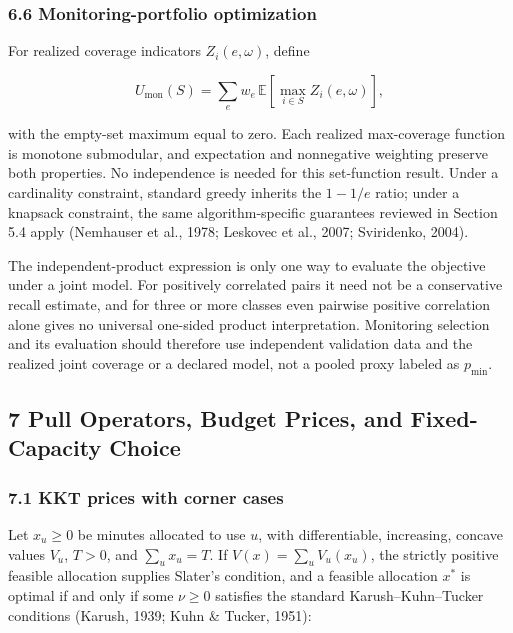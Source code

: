 \documentclass[
  11pt]{article}
\begin{document}
\subsubsection{6.6 Monitoring-portfolio
optimization}\label{monitoring-portfolio-optimization}

For realized coverage indicators \(Z_i(e,\omega)\), define

\[U_{\mathrm{mon}}(S)=\sum_e w_e\,\mathbb E\!\left[\max_{i\in S}Z_i(e,\omega)\right],\]

with the empty-set maximum equal to zero. Each realized max-coverage
function is monotone submodular, and expectation and nonnegative
weighting preserve both properties. No independence is needed for this
set-function result. Under a cardinality constraint, standard greedy
inherits the \(1-1/e\) ratio; under a knapsack constraint, the same
algorithm-specific guarantees reviewed in Section 5.4 apply (Nemhauser
et al., 1978; Leskovec et al., 2007; Sviridenko, 2004).

The independent-product expression is only one way to evaluate the
objective under a joint model. For positively correlated pairs it need
not be a conservative recall estimate, and for three or more classes
even pairwise positive correlation alone gives no universal one-sided
product interpretation. Monitoring selection and its evaluation should
therefore use independent validation data and the realized joint
coverage or a declared model, not a pooled proxy labeled as
\(p_{\min}\).

\subsection{7 Pull Operators, Budget Prices, and Fixed-Capacity
Choice}\label{pull-operators-budget-prices-and-fixed-capacity-choice}

\subsubsection{7.1 KKT prices with corner
cases}\label{kkt-prices-with-corner-cases}

Let \(x_u\ge0\) be minutes allocated to use \(u\), with differentiable,
increasing, concave values \(V_u\), \(T>0\), and \(\sum_ux_u=T\). If
\(V(x)=\sum_uV_u(x_u)\), the strictly positive feasible allocation
supplies Slater's condition, and a feasible allocation \(x^*\) is
optimal if and only if some \(\nu\ge0\) satisfies the standard
Karush--Kuhn--Tucker conditions (Karush, 1939; Kuhn \& Tucker, 1951):
\end{document}
